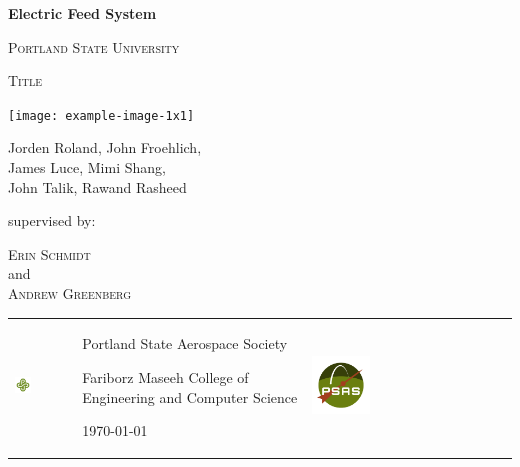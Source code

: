 \documentclass[11pt,twoside,a4paper,openright]{report}
\begin{document}
\begin{titlepage}

	\centering
	{\huge\bfseries Electric Feed System\par}
	\vspace{0.5cm}
	{\scshape\LARGE Portland State University \par}
	\vspace{0.5cm}
	{\scshape\Large Title \par}%
	\vspace{1cm}
		\texttt{[image: example-image-1x1]}\par\vspace{1cm}

	{\Large\itshape 	{Jorden Roland, 
John Froehlich,\\
James Luce, 
Mimi Shang,\\
John Talik, 
Rawand Rasheed\par}}
	\vfill
	supervised by:\par
    \textsc{Erin Schmidt}\\
	and\\
	\textsc{Andrew Greenberg}

	\vspace{3cm}


\centering
\begin{table}[!b]


  \begin{tabular}{  p{2cm}  m{15.5cm}  p{3cm}  }
  
\begin{minipage}{.3\textwidth}
      \includegraphics[width=0.3\textwidth]{logo.png}
    \end{minipage}
&
 \centering
{Portland State Aerospace Society}\par
{Fariborz Maseeh College of Engineering and Computer Science}\par
{\large \today \par}
&	
\begin{minipage}{.3\textwidth}
      \includegraphics[width=0.3\textwidth]{psas_insignia.png}
    \end{minipage}
    
\end{tabular}
\end{table}

\end{titlepage}
\end{document}
